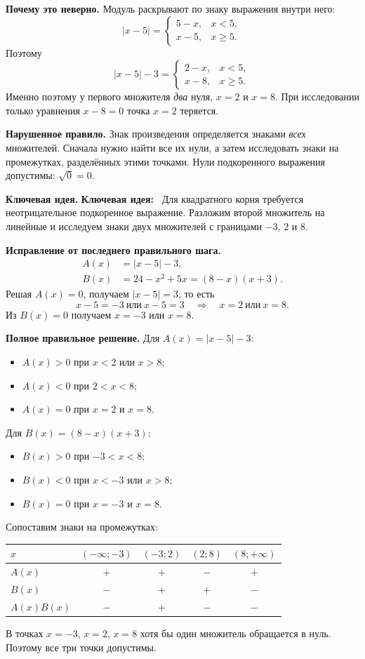 \documentclass[a4paper,12pt]{article}
\newcommand{\labeltext}[1]{\par\noindent\textbf{\color{ink}#1}\quad}
\newcommand{\idea}{\textbf{\color{keyblue}Ключевая идея:}\ }
\begin{document}
\labeltext{Почему это неверно.}
Модуль раскрывают по знаку выражения внутри него:
\[
|x-5|=
\begin{cases}
5-x,&x<5,\\
x-5,&x\ge5.
\end{cases}
\]
Поэтому
\[
|x-5|-3=
\begin{cases}
2-x,&x<5,\\
x-8,&x\ge5.
\end{cases}
\]
Именно поэтому у первого множителя \emph{два} нуля, $x=2$ и $x=8$. При исследовании только уравнения $x-8=0$ точка $x=2$ теряется.

\labeltext{Нарушенное правило.}
Знак произведения определяется знаками \emph{всех} множителей. Сначала нужно найти все их нули, а затем исследовать знаки на промежутках, разделённых этими точками. Нули подкоренного выражения допустимы: $\sqrt0=0$.

\labeltext{Ключевая идея.} \idea
Для квадратного корня требуется неотрицательное подкоренное выражение. Разложим второй множитель на линейные и исследуем знаки двух множителей с границами $-3$, $2$ и $8$.

\labeltext{Исправление от последнего правильного шага.}
\[
\begin{aligned}
A(x)&=|x-5|-3,\\
B(x)&=24-x^2+5x=(8-x)(x+3).
\end{aligned}
\]
Решая $A(x)=0$, получаем $|x-5|=3$, то есть
\[
x-5=-3\ \text{или}\ x-5=3
\quad\Longrightarrow\quad x=2\ \text{или}\ x=8.
\]
Из $B(x)=0$ получаем $x=-3$ или $x=8$.

\labeltext{Полное правильное решение.}
Для $A(x)=|x-5|-3$:
\begin{itemize}
\item $A(x)>0$ при $x<2$ или $x>8$;
\item $A(x)<0$ при $2<x<8$;
\item $A(x)=0$ при $x=2$ и $x=8$.
\end{itemize}
Для $B(x)=(8-x)(x+3)$:
\begin{itemize}
\item $B(x)>0$ при $-3<x<8$;
\item $B(x)<0$ при $x<-3$ или $x>8$;
\item $B(x)=0$ при $x=-3$ и $x=8$.
\end{itemize}
Сопоставим знаки на промежутках:
\begin{center}
\small
\renewcommand{\arraystretch}{1.22}
\begin{tabular}{@{}lcccc@{}}
\toprule
$x$ & $(-\infty;-3)$ & $(-3;2)$ & $(2;8)$ & $(8;+\infty)$\\
\midrule
$A(x)$ & $+$ & $+$ & $-$ & $+$\\
$B(x)$ & $-$ & $+$ & $+$ & $-$\\
$A(x)B(x)$ & $-$ & $+$ & $-$ & $-$\\
\bottomrule
\end{tabular}
\end{center}
В точках $x=-3$, $x=2$, $x=8$ хотя бы один множитель обращается в нуль. Поэтому все три точки допустимы.
\end{document}
